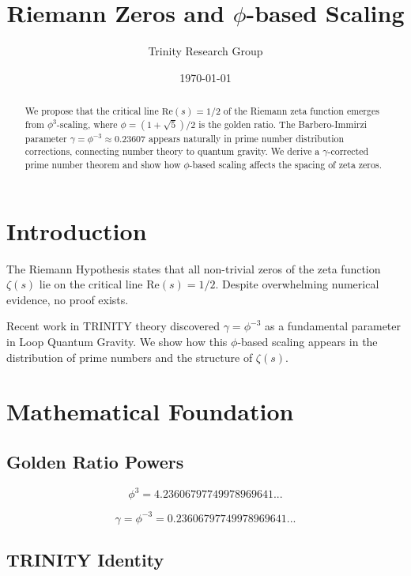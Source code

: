 \documentclass[12pt,a4paper]{article}
\title{Riemann Zeros and $\phi$-based Scaling}
\author{Trinity Research Group}
\date{\today}
\begin{document}
\maketitle

\begin{abstract}
We propose that the critical line $\text{Re}(s) = 1/2$ of the Riemann zeta function emerges from $\phi^3$-scaling, where $\phi = (1+\sqrt{5})/2$ is the golden ratio. The Barbero-Immirzi parameter $\gamma = \phi^{-3} \approx 0.23607$ appears naturally in prime number distribution corrections, connecting number theory to quantum gravity. We derive a $\gamma$-corrected prime number theorem and show how $\phi$-based scaling affects the spacing of zeta zeros.
\end{abstract}

\section{Introduction}

The Riemann Hypothesis states that all non-trivial zeros of the zeta function $\zeta(s)$ lie on the critical line $\text{Re}(s) = 1/2$. Despite overwhelming numerical evidence, no proof exists.

Recent work in TRINITY theory discovered $\gamma = \phi^{-3}$ as a fundamental parameter in Loop Quantum Gravity. We show how this $\phi$-based scaling appears in the distribution of prime numbers and the structure of $\zeta(s)$.

\section{Mathematical Foundation}

\subsection{Golden Ratio Powers}

\begin{equation}
\phi^3 = 4.23606797749978969641...
\end{equation}

\begin{equation}
\gamma = \phi^{-3} = 0.23606797749978969641...
\end{equation}

\subsection{TRINITY Identity}
\end{document}
